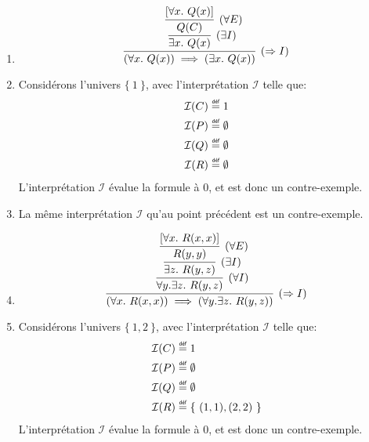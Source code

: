 \documentclass[12pt,french,a4paper]{article}
\newcommand\eqdef{\mathrel{\overset{\makebox[0pt]{\mbox{\normalfont\tiny\sffamily déf}}}{=}}}
\begin{document}
\begin{question}
\begin{enumerate}
\item

\[
\infer[(\Rightarrow{}I)]{(\forall x.\ Q(x)) \implies (\exists x.\ Q(x))}{
\infer[(\exists I)]{\exists x.\ Q(x)}{
\infer[(\forall E)]{Q(C)}{[\forall x.\ Q(x)]}
}
}
\]
\item
Considérons l'univers $\{\ 1\ \}$, avec l'interprétation $\mathcal{I}$ telle que:
\begin{align*}
\mathcal{I}(C) &\eqdef 1\\
\mathcal{I}(P) &\eqdef \emptyset\\
\mathcal{I}(Q) &\eqdef \emptyset\\
\mathcal{I}(R) &\eqdef \emptyset
\end{align*}
L'interprétation $\mathcal{I}$ évalue la formule à $0$, et est donc un contre-exemple.
\item La même interprétation $\mathcal{I}$ qu'au point précédent est un contre-exemple.
\item
\[
\infer[(\Rightarrow{}I)]{(\forall x.\ R(x, x)) \implies (\forall y. \exists z.\ R(y, z))}{
\infer[(\forall I)]{\forall y. \exists z.\ R(y, z)}{
\infer[(\exists I)]{\exists z.\ R(y, z)}{
\infer[(\forall E)]{R(y, y)}{[\forall x.\ R(x, x)]}
}
}
}
\]
\item
Considérons l'univers $\{\ 1, 2\ \}$, avec l'interprétation $\mathcal{I}$ telle que:
\begin{align*}
\mathcal{I}(C) &\eqdef 1\\
\mathcal{I}(P) &\eqdef \emptyset\\
\mathcal{I}(Q) &\eqdef \emptyset\\
\mathcal{I}(R) &\eqdef \{\ (1, 1), (2, 2)\ \}
\end{align*}
L'interprétation $\mathcal{I}$ évalue la formule à $0$, et est donc un contre-exemple.
\end{enumerate}
\end{question}
\end{document}
